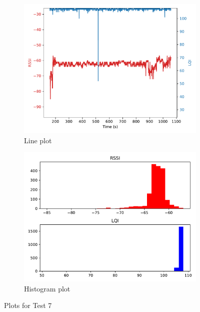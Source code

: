 \documentclass[runningheads]{llncs}
\begin{document}
\begin{figure}[ht]
    \centering
    \begin{subfigure}[b]{0.45\textwidth}
        \centering
        \includegraphics[width=\textwidth]{images/1-50-0-20-line.pdf}
        \caption{Line plot}
    \end{subfigure}
    \hfill
    \begin{subfigure}[b]{0.45\textwidth}
        \centering
        \includegraphics[width=\textwidth]{images/1-50-0-20-histogram.pdf}
        \caption{Histogram plot}
    \end{subfigure}
    \caption{Plots for Test 7}
\end{figure}
\end{document}
